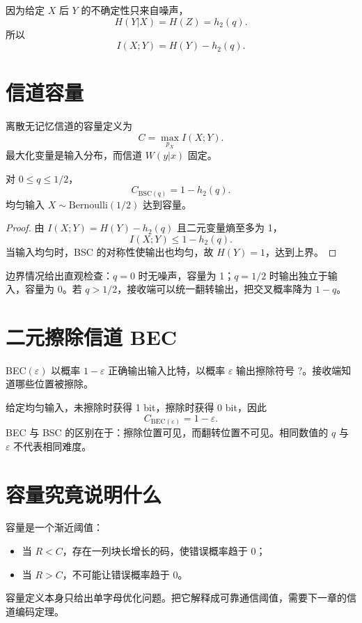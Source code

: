 因为给定 $X$ 后 $Y$ 的不确定性只来自噪声，
\[
H(Y|X)=H(Z)=h_2(q).
\]
所以
\[
I(X;Y)=H(Y)-h_2(q).
\]

\section{信道容量}

\begin{definition}[容量]
离散无记忆信道的容量定义为
\[
C=\max_{p_X}I(X;Y).
\]
最大化变量是输入分布，而信道 $W(y|x)$ 固定。
\end{definition}

\begin{theorem}[BSC 容量]
对 $0\le q\le1/2$，
\[
C_{\mathrm{BSC}(q)}=1-h_2(q).
\]
均匀输入 $X\sim\mathrm{Bernoulli}(1/2)$ 达到容量。
\end{theorem}

\begin{proof}
由 $I(X;Y)=H(Y)-h_2(q)$ 且二元变量熵至多为 1，
\[
I(X;Y)\le1-h_2(q).
\]
当输入均匀时，BSC 的对称性使输出也均匀，故 $H(Y)=1$，达到上界。
\end{proof}

边界情况给出直观检查：$q=0$ 时无噪声，容量为 1；$q=1/2$ 时输出独立于输入，容量为 0。若 $q>1/2$，接收端可以统一翻转输出，把交叉概率降为 $1-q$。

\section{二元擦除信道 BEC}

BEC$(\varepsilon)$ 以概率 $1-\varepsilon$ 正确输出输入比特，以概率 $\varepsilon$ 输出擦除符号 $?$。接收端知道哪些位置被擦除。

给定均匀输入，未擦除时获得 1 bit，擦除时获得 0 bit，因此
\[
C_{\mathrm{BEC}(\varepsilon)}=1-\varepsilon.
\]
BEC 与 BSC 的区别在于：擦除位置可见，而翻转位置不可见。相同数值的 $q$ 与 $\varepsilon$ 不代表相同难度。

\section{容量究竟说明什么}

容量是一个渐近阈值：
\begin{itemize}
  \item 当 $R<C$，存在一列块长增长的码，使错误概率趋于 0；
  \item 当 $R>C$，不可能让错误概率趋于 0。
\end{itemize}
容量定义本身只给出单字母优化问题。把它解释成可靠通信阈值，需要下一章的信道编码定理。

